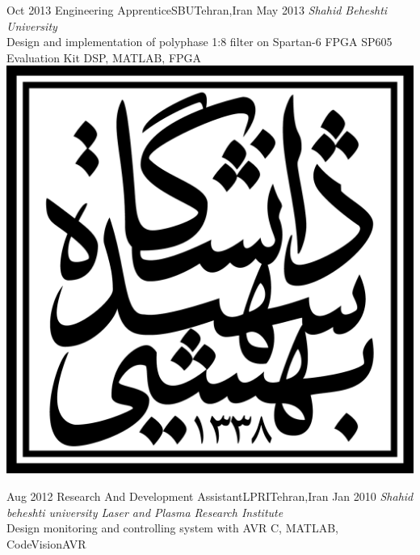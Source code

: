 \begin{experiences}
  \emptySeparator

  \experience
  {Oct 2013} {Engineering Apprentice}{SBU}{Tehran,Iran}
  {May 2013} {
    \emph{Shahid Beheshti University}
    \\ Design and implementation of polyphase 1:8 filter on Spartan-6 FPGA SP605 Evaluation Kit
  }
  {DSP, MATLAB, FPGA}
  {\includegraphics[scale=0.05]{graphics/SBU_logo}}

  \emptySeparator

  \experience
  {Aug 2012} {Research And Development Assistant}{LPRI}{Tehran,Iran}
  {Jan 2010} {
    \emph{Shahid beheshti university Laser and Plasma Research Institute}
    \\Design  monitoring and controlling system with AVR
  }
  {C, MATLAB, CodeVisionAVR}
  {}

  \emptySeparator

\end{experiences}
